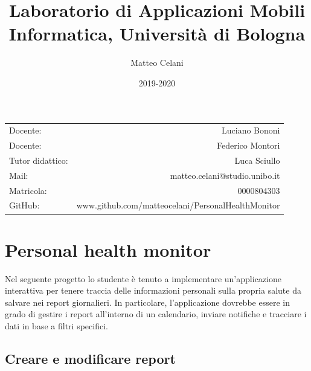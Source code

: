 \documentclass{article}
\title{Laboratorio di Applicazioni Mobili\\Informatica, Università di Bologna} %
\author{Matteo Celani} %
\date{2019-2020} %
\begin{document}
\maketitle %

\begin{center}
\begin{tabular}{l r}
Docente: 					& Luciano Bononi \\ 
Docente: 					& Federico Montori  \\ 
\medskip
Tutor didattico: 		& Luca Sciullo \\ 
Mail: 							& matteo.celani@studio.unibo.it \\
\bigskip
Matricola: 					& 0000804303 \\
GitHub: 					&www.github.com/matteocelani/PersonalHealthMonitor\\
\end{tabular}
\end{center}

\newpage
\tableofcontents

\newpage
\section{Personal health monitor}

Nel seguente progetto lo studente è tenuto a implementare un'applicazione interattiva per tenere traccia delle informazioni personali sulla propria salute da salvare nei report giornalieri. In particolare, l'applicazione dovrebbe essere in grado di gestire i report all'interno di un calendario, inviare notifiche e tracciare i dati in base a filtri specifici.

\subsection{Creare e modificare report}
\end{document}

